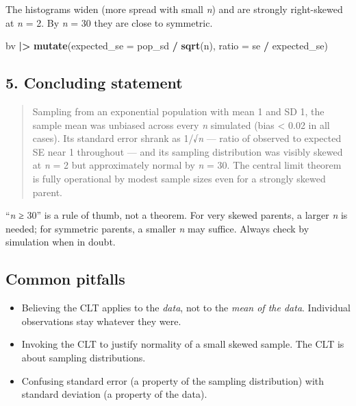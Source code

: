 \documentclass[
]{article}
\newenvironment{Shaded}{\begin{snugshade}}{\end{snugshade}}
\newcommand{\AttributeTok}[1]{\textcolor[rgb]{0.13,0.29,0.53}{#1}}
\newcommand{\FunctionTok}[1]{\textcolor[rgb]{0.13,0.29,0.53}{\textbf{#1}}}
\newcommand{\NormalTok}[1]{#1}
\newcommand{\SpecialCharTok}[1]{\textcolor[rgb]{0.81,0.36,0.00}{\textbf{#1}}}
\providecommand{\tightlist}{%
  \setlength{\itemsep}{0pt}\setlength{\parskip}{0pt}}
\begin{document}
The histograms widen (more spread with small \emph{n}) and are strongly
right-skewed at \emph{n} = 2. By \emph{n} = 30 they are close to
symmetric.

\begin{Shaded}
\begin{Highlighting}[]
\NormalTok{bv }\SpecialCharTok{|\textgreater{}} \FunctionTok{mutate}\NormalTok{(}\AttributeTok{expected\_se =}\NormalTok{ pop\_sd }\SpecialCharTok{/} \FunctionTok{sqrt}\NormalTok{(n),}
             \AttributeTok{ratio =}\NormalTok{ se }\SpecialCharTok{/}\NormalTok{ expected\_se)}
\end{Highlighting}
\end{Shaded}

\subsection{5. Concluding statement}\label{concluding-statement}

\begin{quote}
Sampling from an exponential population with mean 1 and SD 1, the sample
mean was unbiased across every \emph{n} simulated
(\textbar bias\textbar{} \textless{} 0.02 in all cases). Its standard
error shrank as 1/√\emph{n} --- ratio of observed to expected SE near 1
throughout --- and its sampling distribution was visibly skewed at
\emph{n} = 2 but approximately normal by \emph{n} = 30. The central
limit theorem is fully operational by modest sample sizes even for a
strongly skewed parent.
\end{quote}

``\emph{n} ≥ 30'' is a rule of thumb, not a theorem. For very skewed
parents, a larger \emph{n} is needed; for symmetric parents, a smaller
\emph{n} may suffice. Always check by simulation when in doubt.

\subsection{Common pitfalls}\label{common-pitfalls}

\begin{itemize}
\tightlist
\item
  Believing the CLT applies to the \emph{data}, not to the \emph{mean of
  the data}. Individual observations stay whatever they were.
\item
  Invoking the CLT to justify normality of a small skewed sample. The
  CLT is about sampling distributions.
\item
  Confusing standard error (a property of the sampling distribution)
  with standard deviation (a property of the data).
\end{itemize}
\end{document}

